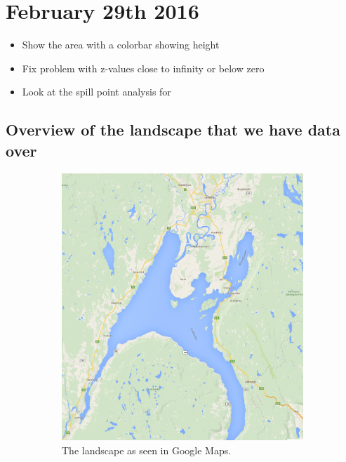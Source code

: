 \documentclass[10pt,a4paper]{article}
\begin{document}
\section{February 29th 2016}
\begin{itemize}
\item Show the area with a colorbar showing height
\item Fix problem with z-values close to infinity or below zero
\item Look at the spill point analysis for 
\end{itemize}

\subsection{Overview of the landscape that we have data over}
\begin{figure}[h!]
    \centering
    \begin{subfigure}[h]{0.65\textwidth}
        \centering
        \includegraphics[height=1\textwidth]{map_area.png}
        \caption{The landscape as seen in Google Maps.}
    \end{subfigure}%
    ~ 
    \begin{subfigure}[h]{0.65\textwidth}
        \centering

\end{subfigure}
\end{figure}
\end{document}
